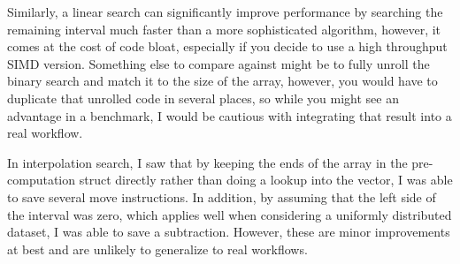 \documentclass{article}
\begin{document}
Similarly, a linear search can significantly improve performance by searching the remaining interval much faster than a more sophisticated algorithm, however, it comes at the cost of code bloat, especially if you decide to use a high throughput SIMD version. Something else to compare against might be to fully unroll the binary search and match it to the size of the array, however, you would have to duplicate that unrolled code in several places, so while you might see an advantage in a benchmark, I would be cautious with integrating that result into a real workflow.

In interpolation search, I saw that by keeping the ends of the array in the pre-computation struct directly rather than doing a lookup into the vector, I was able to save several move instructions. In addition, by assuming that the left side of the interval was zero, which applies well when considering a uniformly distributed dataset, I was able to save a subtraction. However, these are minor improvements at best and are unlikely to generalize to real workflows.

\begin{figure}
\end{figure}

\begin{figure}
\end{figure}
\end{document}
